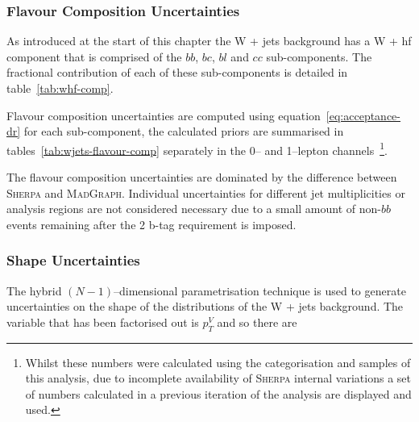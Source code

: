 \subsubsection{Flavour Composition Uncertainties}

As introduced at the start of this chapter the W + jets background has a W + hf
component that is comprised of the $bb$, $bc$, $bl$ and $cc$ sub-components. The
fractional contribution of each of these sub-components is detailed in
table~\ref{tab:whf-comp}.

Flavour composition uncertainties are computed using
equation~\ref{eq:acceptance-dr} for each sub-component, the calculated priors
are summarised in tables~\ref{tab:wjets-flavour-comp} separately in the 0-- and
1--lepton channels~\footnote{Whilst these numbers were calculated using the
  categorisation and samples of this analysis, due to incomplete availability of
  \textsc{Sherpa} internal variations a set of numbers calculated in a previous
  iteration of the analysis are displayed and used.}.

The flavour composition uncertainties are dominated by the difference between
\textsc{Sherpa} and \textsc{MadGraph}. Individual uncertainties for different
jet multiplicities or analysis regions are not considered necessary due to a
small amount of non-$bb$ events remaining after the 2 b-tag requirement is
imposed.

\subsubsection{Shape Uncertainties}

The hybrid $(N-1)$--dimensional parametrisation technique is used to generate
uncertainties on the shape of the distributions of the W + jets background. The
variable that has been factorised out is $p_T^V$ and so there are 





